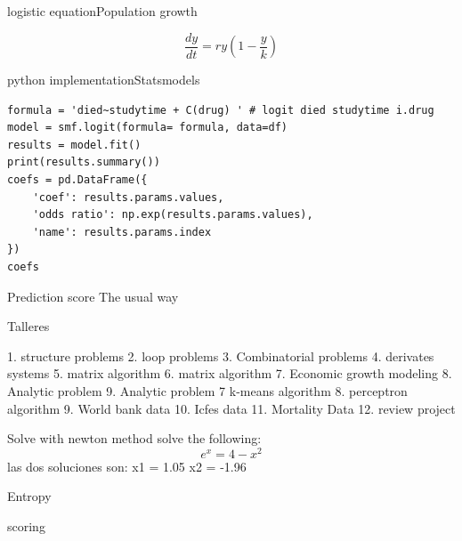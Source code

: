\documentclass{beamer}
\begin{document}
\begin{frame}{logistic equation}{Population growth}


\begin{equation}
\frac{dy}{dt} = ry(1-\frac{y}{k})
\end{equation}

\end{frame}




\begin{frame}[fragile]{python implementation}{Statsmodels}
\begin{lstlisting}
formula = 'died~studytime + C(drug) ' # logit died studytime i.drug 
model = smf.logit(formula= formula, data=df)
results = model.fit()
print(results.summary())
coefs = pd.DataFrame({
    'coef': results.params.values,
    'odds ratio': np.exp(results.params.values),
    'name': results.params.index
})
coefs
\end{lstlisting}
\end{frame}




\begin{frame}{Prediction score}
The usual way 

\end{frame}



\begin{frame}{Talleres}
\begin{itemize}
1. structure problems
2. loop problems
3. Combinatorial problems
4. derivates systems
5. matrix  algorithm
6. matrix  algorithm
7. Economic growth modeling
8. Analytic problem
9. Analytic problem
7  k-means algorithm
8. perceptron algorithm
9.  World bank data 
10. Icfes data
11. Mortality Data
12. review project 
\end{itemize}
\end{frame}


\begin{frame}{Solve}
with newton method solve the following:
\begin{equation}
e^{x} = 4 - x^{2}
\end{equation}
las dos soluciones son:
x1 = 1.05
x2 = -1.96
\end{frame}








\begin{frame}{Entropy}

\end{frame}








\begin{frame}{scoring}

\end{frame}
\end{document}

